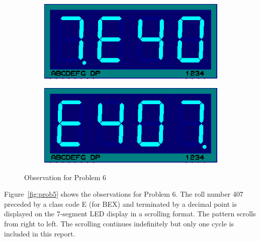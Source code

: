 \documentclass{lab_sheet}
\begin{document}
\begin{figure}[H]
\begin{subfigure}{.33\textwidth}
              \label{fig:prob6-c}
              \caption{}
            \end{subfigure}
            \newline
              \hspace*{\fill}
              \begin{subfigure}{.33\textwidth}
                \centering
                \includegraphics[frame,width=.9\linewidth]{../Figures/scr4}     
                \caption{}
                \label{fig:prob6-d}
              \end{subfigure}
              \begin{subfigure}{.33\textwidth}
                \centering
                \includegraphics[frame,width=.9\linewidth]{../Figures/scr1}   
                \caption{}
                \label{fig:prob6-e}
              \end{subfigure}
              \hspace*{\fill}
            \caption{Observation for Problem 6}
            \label{fig:prob6}
            \end{figure}
            Figure~\ref{fig:prob5} shows the observations for Problem 6. The roll number 407 preceded by a class code E (for BEX) and terminated by a decimal point is displayed on the 7-segment LED display in a scrolling format. The pattern scrolls from right to left. The scrolling continues indefinitely but only one cycle is included in this report.
\end{document}
